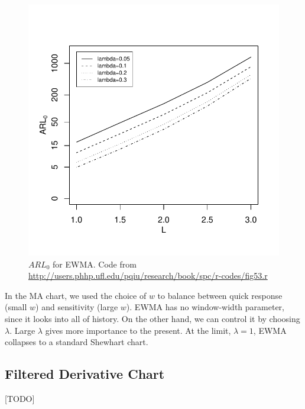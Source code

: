 \documentclass[12pt,a4paper]{report}
\theoremstyle{plain}
\theoremstyle{definition}
\begin{document}
\begin{figure}[h]
\centering
\includegraphics[height=0.3\textheight]{art/fig53}
\caption[$ARL_0$ for EWMA]{$ARL_0$ for EWMA. \newline Code from \url{http://users.phhp.ufl.edu/pqiu/research/book/spc/r-codes/fig53.r}}
\label{fig:arl_0_ewma}
\end{figure}

In the MA chart, we used the choice of $w$ to balance between quick response (small $w$) and sensitivity (large $w$).
EWMA has no window-width parameter, since it looks into all of history. On the other hand, we can control it by choosing $\lambda$. 
Large $\lambda$ gives more importance to the present. At the limit, $\lambda=1$, EWMA collapses to a standard Shewhart chart.







\subsection{Filtered Derivative Chart}
[TODO]
\end{document}
